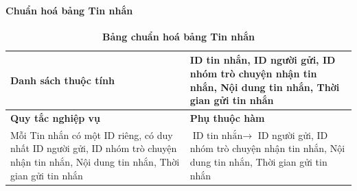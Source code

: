 \paragraph{Chuẩn hoá bảng Tin nhắn}
\mbox{}
\begin{table}[H]
	\caption{\bfseries \fontsize{12pt}{0pt}\selectfont Bảng chuẩn hoá bảng Tin nhắn}
	\centering
	\begin{tabularx}{0.9\textwidth}{|X|X|}
		\hline
		\textbf{Danh sách thuộc tính} & ID tin nhắn, ID người gửi, ID nhóm trò chuyện nhận tin nhắn, Nội dung tin nhắn, Thời gian gửi tin nhắn                                             \\
		\hline
		\textbf{Quy tắc nghiệp vụ}    & \textbf{Phụ thuộc hàm}                                                                                                                             \\
		\hline
		Mỗi Tin nhắn có một ID riêng, có duy nhất ID người gửi, ID nhóm trò chuyện nhận tin nhắn, Nội dung tin nhắn, Thời gian gửi tin nhắn
		                              & \parbox[t]{\linewidth}{$\text{ID tin nhắn} \rightarrow$ ID người gửi, ID nhóm trò chuyện nhận tin nhắn, Nội dung tin nhắn, Thời gian gửi tin nhắn} \\
		\hline
		                                                                                                       \\
		                                                                                                                  \\
		\hline
	\end{tabularx}
\end{table}

